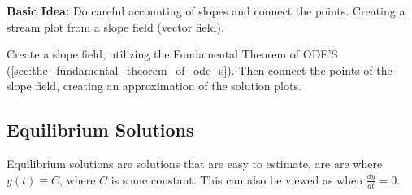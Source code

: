 \documentclass{article}
\begin{document}
\textbf{Basic Idea:} Do careful accounting of slopes and connect the points.
Creating a stream plot from a slope field (vector field).

Create a slope field, utilizing the Fundamental Theorem of ODE'S
(\ref{sec:the_fundamental_theorem_of_ode_s}). Then connect the points of the
slope field, creating an approximation of the solution plots.

\subsection{Equilibrium Solutions}\label{sub:equilibrium_solutions}

Equilibrium solutions are solutions that are easy to estimate, are are where
$y(t) \equiv C$, where $C$ is some constant. This can also be viewed as when
$\frac{dy}{dt} = 0$.
\end{document}
